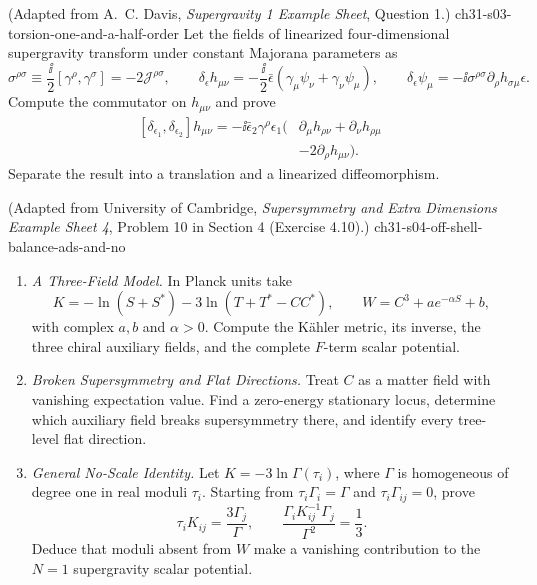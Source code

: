 \begin{enumerate}
    {(Adapted from A.~C. Davis, \emph{Supergravity 1 Example Sheet}, Question 1.)}
    {ch31-s03-torsion-one-and-a-half-order}
Let the fields of linearized four-dimensional supergravity transform
  under constant Majorana parameters as
  \[
    \sigma^{\rho\sigma}
      \equiv\frac{\ii}{2}[\gamma^\rho,\gamma^\sigma]
      =-2\mathcal J^{\rho\sigma},
    \qquad
    \delta_\epsilon h_{\mu\nu}
      =-\frac{\ii}{2}\bar\epsilon
        (\gamma_\mu\psi_\nu+\gamma_\nu\psi_\mu),
    \qquad
    \delta_\epsilon\psi_\mu
      =-\ii\sigma^{\rho\sigma}\partial_\rho h_{\sigma\mu}\epsilon .
  \]
  Compute the commutator on \(h_{\mu\nu}\) and prove
  \[
  \begin{aligned}
    [\delta_{\epsilon_1},\delta_{\epsilon_2}]h_{\mu\nu}
      =-\ii\bar\epsilon_2\gamma^\rho\epsilon_1
       \big(&\partial_\mu h_{\rho\nu}
             +\partial_\nu h_{\rho\mu}\\
             &-2\partial_\rho h_{\mu\nu}\big).
  \end{aligned}
  \]
  Separate the result into a translation and a linearized
  diffeomorphism.

    {(Adapted from University of Cambridge, \emph{Supersymmetry and Extra Dimensions Example Sheet 4}, Problem 10 in Section 4 (Exercise 4.10).)}
    {ch31-s04-off-shell-balance-ads-and-no}
  \begin{enumerate}
    \item \emph{A Three-Field Model.}
    In Planck units take
      \[
        K=-\ln(S+S^*)-3\ln(T+T^*-CC^*),\qquad
        W=C^3+ae^{-\alpha S}+b,
      \]
      with complex \(a,b\) and \(\alpha>0\).  Compute the Kähler metric,
      its inverse, the three chiral auxiliary fields, and the complete
      \(F\)-term scalar potential.
    \item \emph{Broken Supersymmetry and Flat Directions.}
    Treat \(C\) as a matter field with vanishing expectation value.  Find a
      zero-energy stationary locus, determine which auxiliary field breaks
      supersymmetry there, and identify every tree-level flat direction.
    \item \emph{General No-Scale Identity.}
    Let \(K=-3\ln\Gamma(\tau_i)\), where \(\Gamma\) is homogeneous of degree
      one in real moduli \(\tau_i\).  Starting from
      \(\tau_i\Gamma_i=\Gamma\) and
      \(\tau_i\Gamma_{ij}=0\), prove
      \[
        \tau_iK_{ij}=\frac{3\Gamma_j}{\Gamma},
        \qquad
        \frac{\Gamma_iK^{-1}_{ij}\Gamma_j}{\Gamma^2}=\frac13.
      \]
      Deduce that moduli absent from \(W\) make a vanishing contribution to
      the \(N=1\) supergravity scalar potential.
  \end{enumerate}


\end{enumerate}
